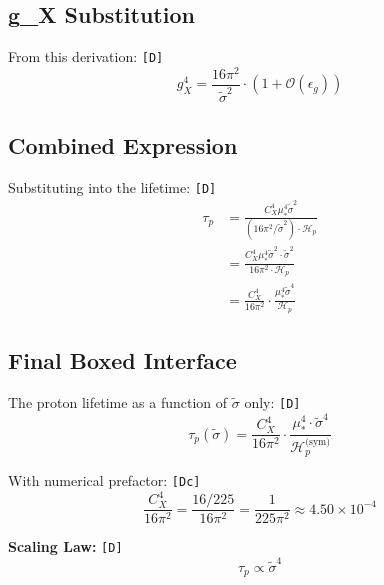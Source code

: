 \documentclass[11pt,a4paper]{article}
\newcommand{\tagD}{\textcolor{green!50!black}{\texttt{[D]}}}
\newcommand{\tagDc}{\textcolor{blue!70!black}{\texttt{[Dc]}}}
\theoremstyle{definition}
\begin{document}
\subsection{g\_X Substitution}
\label{subsec:gx-subst}

From this derivation: \tagD{}
\begin{equation}
\label{eq:gx-subst}
g_X^4 = \frac{16\pi^2}{\tilde{\sigma}^2} \cdot (1 + \mathcal{O}(\epsilon_g))
\end{equation}

\subsection{Combined Expression}
\label{subsec:combined}

Substituting into the lifetime: \tagD{}
\begin{align}
\label{eq:taup-combined-1}
\tau_p &= \frac{C_X^4 \mu_*^4 \tilde{\sigma}^2}{(16\pi^2/\tilde{\sigma}^2) \cdot \mathcal{H}_p} \\
\label{eq:taup-combined-2}
&= \frac{C_X^4 \mu_*^4 \tilde{\sigma}^2 \cdot \tilde{\sigma}^2}{16\pi^2 \cdot \mathcal{H}_p} \\
\label{eq:taup-combined-3}
&= \frac{C_X^4}{16\pi^2} \cdot \frac{\mu_*^4 \tilde{\sigma}^4}{\mathcal{H}_p}
\end{align}

\subsection{Final Boxed Interface}
\label{subsec:final-boxed}

\begin{derivbox}
The proton lifetime as a function of $\tilde{\sigma}$ only: \tagD{}
\begin{equation}
\label{eq:taup-final-boxed}
\boxed{\tau_p(\tilde{\sigma}) = \frac{C_X^4}{16\pi^2} \cdot \frac{\mu_*^4 \cdot \tilde{\sigma}^4}{\mathcal{H}_p^{\text{(sym)}}}}
\end{equation}

With numerical prefactor: \tagDc{}
\begin{equation}
\label{eq:prefactor-value}
\frac{C_X^4}{16\pi^2} = \frac{16/225}{16\pi^2} = \frac{1}{225\pi^2} \approx 4.50 \times 10^{-4}
\end{equation}

\textbf{Scaling Law:} \tagD{}
\begin{equation}
\label{eq:scaling-law-final}
\boxed{\tau_p \propto \tilde{\sigma}^4}
\end{equation}
\end{derivbox}
\end{document}
